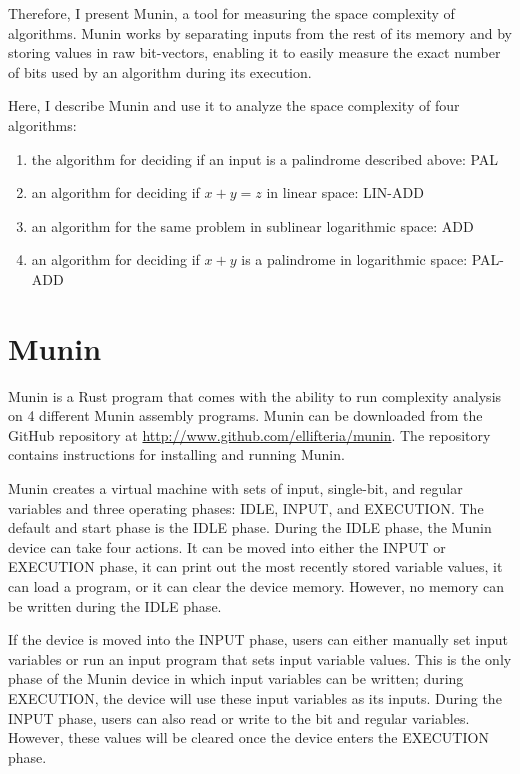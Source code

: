 \documentclass[11pt, a4paper]{article}
\begin{document}
Therefore, I present Munin, a tool for measuring the space complexity of algorithms.
Munin works by separating inputs from the rest of its memory and by storing values in raw bit-vectors, enabling it to easily measure the exact number of bits used by an algorithm during its execution.

Here, I describe Munin and use it to analyze the space complexity of four algorithms:
\begin{enumerate}
    \item the algorithm for deciding if an input is a palindrome described above: PAL
    \item an algorithm for deciding if \(x+y=z\) in linear space: LIN-ADD
    \item an algorithm for the same problem in sublinear logarithmic space: ADD
    \item an algorithm for deciding if \(x+y\) is a palindrome in logarithmic space: PAL-ADD
\end{enumerate}

\section{Munin}

Munin is a Rust program that comes with the ability to run complexity analysis on 4 different Munin assembly programs.
Munin can be downloaded from the GitHub repository at \url{http://www.github.com/ellifteria/munin}.
The repository contains instructions for installing and running Munin.

Munin creates a virtual machine with sets of input, single-bit, and regular variables and three operating phases: IDLE, INPUT, and EXECUTION.
The default and start phase is the IDLE phase.
During the IDLE phase, the Munin device can take four actions.
It can be moved into either the INPUT or EXECUTION phase, it can print out the most recently stored variable values, it can load a program, or it can clear the device memory.
However, no memory can be written during the IDLE phase.

If the device is moved into the INPUT phase, users can either manually set input variables or run an input program that sets input variable values.
This is the only phase of the Munin device in which input variables can be written; during EXECUTION, the device will use these input variables as its inputs.
During the INPUT phase, users can also read or write to the bit and regular variables.
However, these values will be cleared once the device enters the EXECUTION phase.
\end{document}
